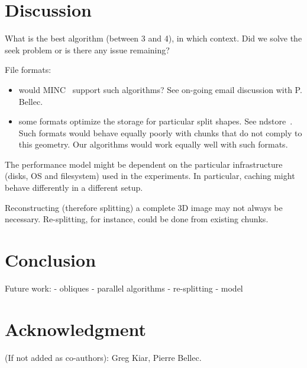 \documentclass[10pt, conference, compsocconf]{IEEEtran}
\begin{document}
\newpage

\section{Discussion}
\label{sec:discussion}

What is the best algorithm (between 3 and 4), in which context. Did we
solve the seek problem or is there any issue remaining?

File formats:
\begin{itemize}
\item would MINC~\cite{vincent2016minc} support such algorithms? See on-going email discussion
with P. Bellec.
\item some formats optimize the storage for particular split shapes. See
  ndstore~\cite{burns2013open}. Such formats would behave equally
  poorly with chunks that do not comply to this geometry. Our
  algorithms would work equally well with such formats.
\end{itemize}

The performance model might be dependent on the particular
infrastructure (disks, OS and filesystem) used in the experiments. In
particular, caching might behave differently in a different setup.

Reconstructing (therefore splitting) a complete 3D image may not
always be necessary. Re-splitting, for instance, could be done from
existing chunks.

\section{Conclusion}

Future work:
- obliques
- parallel algorithms
- re-splitting
- model

\section*{Acknowledgment}

(If not added as co-authors): Greg Kiar, Pierre Bellec.



\end{document}
